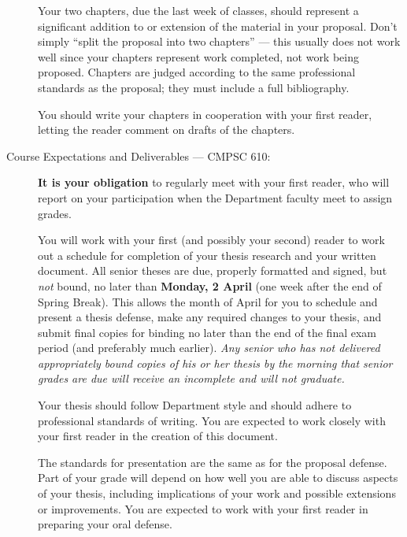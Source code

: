 \begin{description}
\medskip
{} Your two chapters, due the last week 
of classes, should represent 
a significant addition to or extension of the material
in your proposal. Don't simply ``split the proposal into two chapters'' ---
this usually does not work well since
your chapters 
represent work completed, not work being proposed. Chapters are judged
according to the same professional standards as the proposal; they must
include a full bibliography.

You should write your chapters in cooperation with your first reader,
letting the reader comment on drafts of the chapters.

\item[Course Expectations and Deliverables --- CMPSC 610:] \mbox{}


\medskip
{}
{\bf It is your obligation} to regularly meet with your first reader,
who will report on your participation when the Department faculty
meet to assign grades.

\medskip
{}
You will work with your first (and possibly your second) reader to
work out a schedule for completion of your thesis research and your
written document. All senior theses are due, properly formatted and signed, 
but {\em not} bound, no later than {\bf Monday, 2 April} (one week after the end
of Spring Break). This allows the month of April for you to schedule  and
present a thesis defense, make any required changes to your thesis, and
submit final copies for binding no later than the end of the final
exam period (and preferably much earlier). {\em Any senior who has not 
delivered appropriately bound copies of his or her thesis by the morning
that senior grades are due will receive an incomplete and will not graduate.}

Your thesis should follow Department style and should adhere to
professional standards of writing. You are expected to work closely with
your first reader in the creation of this document.

\medskip 
{}
The standards for presentation are the same as for the proposal defense.
Part of your grade will depend on how well you are able to discuss
aspects of your thesis, including 
implications of your work and possible extensions or improvements.
You are expected to work with your first reader in preparing your
oral defense.


\end{description}
